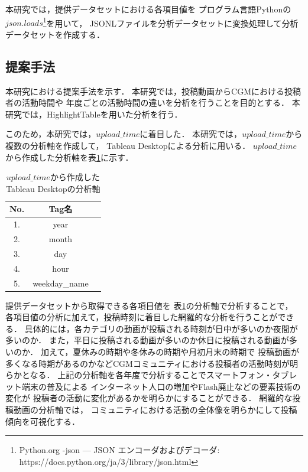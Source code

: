 \documentclass[submit,techrep,noauthor]{ipsj}
\begin{document}
本研究では，提供データセットにおける各項目値を
プログラム言語Pythonの$json.loads$\footnote{Python.org -json --- JSON エンコーダおよびデコーダ:\\
https://docs.python.org/ja/3/library/json.html}を用いて，
JSONLファイルを分析データセットに変換処理して分析データセットを作成する．

\subsection{提案手法}\label{simulation}
本研究における提案手法を示す．
本研究では，投稿動画からCGMにおける投稿者の活動時間や
年度ごとの活動時間の違いを分析を行うことを目的とする．
%
本研究では，HighlightTableを用いた分析を行う．



%
%
このため，本研究では，$upload\_time$に着目した．
本研究では，$upload\_time$から複数の分析軸を作成して，
Tableau Desktopによる分析に用いる．
$upload\_time$から作成した分析軸を表\ref{tab:tableau_analytics_axis}に示す．

\begin{table}[htb]
  \caption{$upload\_time$から作成したTableau Desktopの分析軸} 
  \label{tab:tableau_analytics_axis}
  \begin{center}
  \begin{tabular}{|c||c|c|} \hline
No. & Tag名\\ \hline
1. & year \\ \hline
2. & month \\ \hline
3. & day \\ \hline
4. & hour \\ \hline
5. & weekday\_name \\ \hline
  \end{tabular}
  \end{center}
\end{table}

提供データセットから取得できる各項目値を
表\ref{tab:tableau_analytics_axis}の分析軸で分析することで，
各項目値の分析に加えて，投稿時刻に着目した網羅的な分析を行うことができる．
%
具体的には，各カテゴリの動画が投稿される時刻が日中が多いのか夜間が多いのか．
また，平日に投稿される動画が多いのか休日に投稿される動画が多いのか．
加えて，夏休みの時期や冬休みの時期や月初月末の時期で
投稿動画が多くなる時期があるのかなどCGMコミュニティにおける投稿者の活動時刻が明らかとなる．
%
上記の分析軸を各年度で分析することでスマートフォン・タブレット端末の普及による
インターネット人口の増加やFlash廃止などの要素技術の変化が
投稿者の活動に変化があるかを明らかにすることができる．
網羅的な投稿動画の分析軸では，
コミュニティにおける活動の全体像を明らかにして投稿傾向を可視化する．
\end{document}
